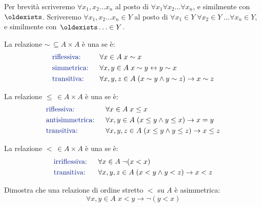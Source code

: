 \begin{notation}
Per brevit\`a scriveremo $\forall x_1,x_2\dotsc x_n$ al posto di $\forall x_1
\forall x_2 \dotsc \forall x_n$, e similmente con~$\oldexists$. Scriveremo
$\forall x_1,x_2\dotsc x_n\in Y$ al posto di $\forall x_1\in Y\;\forall x_2\in Y
\;\dotsc \forall x_n\in Y$, e similmente con~$\oldexists\dotsc\in Y$.
\end{notation}

\begin{definition}
	La relazione $\sim \,\subseteq A \times A$ \`e una  se \`e:
\begin{alignat*}{2}
&\text{\drkblu riflessiva:} && \;\;\forall {x \in A} \; x \sim x\\
&\text{\drkblu simmetrica:} && \;\;\forall {x,y \in A} \; x\sim y \leftrightarrow y \sim x\\
&\text{\drkblu transitiva:} && \;\;\forall {x,y,z \in A} \; (x \sim y \land y \sim z) \rightarrow x \sim z
\end{alignat*}
\end{definition}

\begin{definition}
	La relazione $\leq \, \in A \times A$ \`e una  se \`e:
\begin{alignat*}{2}
&\text{\drkblu riflessiva:} && \;\;\forall {x \in A} \; x \leq x\\
&\text{\drkblu antisimmetrica:} && \;\;\forall {x,y \in A} \; (x \leq y \land y \leq x) \rightarrow x = y\\
&\text{\drkblu transitiva:} && \;\;\forall {x,y,z \in A} \; (x \leq y \land y \leq z) \rightarrow x \leq z
\end{alignat*}
\end{definition}

\begin{definition}
	La relazione $< \, \in A \times A$ \`e una  se \`e:
\begin{alignat*}{2}
&\text{\drkblu irriflessiva:} && \;\;\forall {x \in A} \; \neg(x < x)\\
&\text{\drkblu transitiva:} && \;\;\forall {x,y,z \in A} \; (x < y \land y < z) \rightarrow x < z
\end{alignat*}
\end{definition}

\begin{exercise}
	Dimostra che una relazione di ordine stretto $<$ su $A$ \`e asimmetrica:
	\[ \forall x,y \in A \; x < y \rightarrow \neg (y < x)
		\]
\end{exercise}

